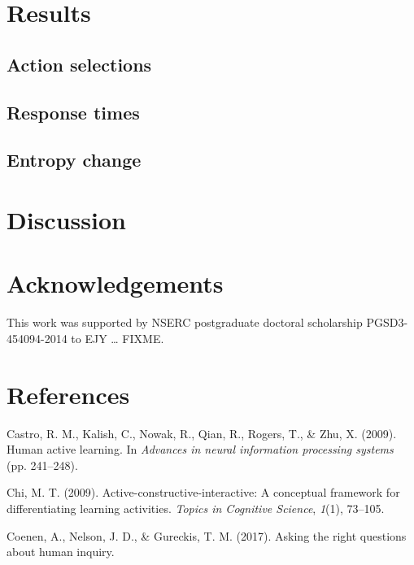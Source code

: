 \documentclass[10pt, letterpaper]{article}
\begin{document}
\section{Results}\label{results}

\subsection{Action selections}\label{action-selections}

\subsection{Response times}\label{response-times}

\subsection{Entropy change}\label{entropy-change}

\section{Discussion}\label{discussion}

\section{Acknowledgements}\label{acknowledgements}

This work was supported by NSERC postgraduate doctoral scholarship
PGSD3-454094-2014 to EJY \ldots{} FIXME.

\section{References}\label{references}

\setlength{\parindent}{-0.1in} \setlength{\leftskip}{0.125in} \noindent

\hypertarget{refs}{}
\hypertarget{ref-castro2009human}{}
Castro, R. M., Kalish, C., Nowak, R., Qian, R., Rogers, T., \& Zhu, X.
(2009). Human active learning. In \emph{Advances in neural information
processing systems} (pp. 241--248).

\hypertarget{ref-chi2009active}{}
Chi, M. T. (2009). Active-constructive-interactive: A conceptual
framework for differentiating learning activities. \emph{Topics in
Cognitive Science}, \emph{1}(1), 73--105.

\hypertarget{ref-coenen2017}{}
Coenen, A., Nelson, J. D., \& Gureckis, T. M. (2017). Asking the right
questions about human inquiry.
\end{document}
